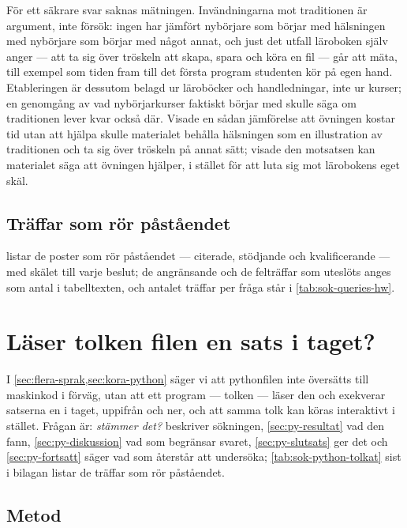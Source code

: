 För ett säkrare svar saknas mätningen.  Invändningarna mot traditionen
är argument, inte försök: ingen har jämfört nybörjare som börjar med
hälsningen med nybörjare som börjar med något annat, och just det utfall
läroboken själv anger --- att ta sig över tröskeln att skapa, spara och
köra en fil --- går att mäta, till exempel som tiden fram till det
första program studenten kör på egen hand.  Etableringen är dessutom
belagd ur läroböcker och handledningar, inte ur kurser; en genomgång av
vad nybörjarkurser faktiskt börjar med skulle säga om traditionen lever
kvar också där.  Visade en sådan jämförelse att övningen kostar tid utan
att hjälpa skulle materialet behålla hälsningen som en illustration av
traditionen och ta sig över tröskeln på annat sätt; visade den motsatsen
kan materialet säga att övningen hjälper, i stället för att luta sig mot
lärobokens eget skäl.

\section{Träffar som rör påståendet}
\label{sec:hw-traffar}

 listar de poster som rör påståendet ---
citerade, stödjande och kvalificerande --- med skälet till varje
beslut; de angränsande och de felträffar som uteslöts anges som antal i
tabelltexten, och antalet träffar per fråga står i
\cref{tab:sok-queries-hw}.



\chapter{Läser tolken filen en sats i taget?}
\label{app:python-tolkat}

I \cref{sec:flera-sprak,sec:kora-python} säger vi att pythonfilen inte
översätts till maskinkod i förväg, utan att ett program --- tolken ---
läser den och exekverar satserna en i taget, uppifrån och ner, och att
samma tolk kan köras interaktivt i stället.  Frågan är: \emph{stämmer det?}
 beskriver sökningen, \cref{sec:py-resultat} vad den
fann, \cref{sec:py-diskussion} vad som begränsar svaret,
\cref{sec:py-slutsats} ger det och \cref{sec:py-fortsatt} säger vad som
återstår att undersöka; \cref{tab:sok-python-tolkat} sist i
bilagan listar de träffar som rör påståendet.

\section{Metod}
\label{sec:py-metod}

